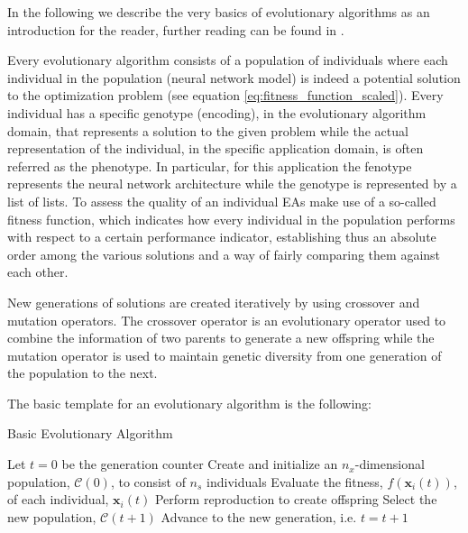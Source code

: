 \documentclass[journal]{IEEEtran}
\begin{document}
In the following we describe the very basics of evolutionary algorithms as an introduction for the reader, further reading can be found in \cite{Engelbrecht, Ebehart2007, Sumathi2010}. 

Every evolutionary algorithm consists of a population of individuals where each individual in the population (neural network model) is indeed a potential solution to the optimization problem (see equation \ref{eq:fitness_function_scaled}). Every individual has a specific genotype (encoding), in the evolutionary algorithm domain, that represents a solution to the given problem while the actual representation of the individual, in the specific application domain, is often referred as the phenotype. In particular, for this application  the fenotype represents the neural network architecture while the genotype is represented by a list of lists. To assess the quality of an individual EAs make use of a so-called fitness function, which indicates how every individual in the population performs with respect to a certain performance indicator, establishing thus an absolute order among the various solutions and a way of fairly comparing them against each other. 

New generations of solutions are created iteratively by using crossover and mutation operators. The crossover operator is an evolutionary operator used to combine the information of two parents to generate a new offspring while the mutation operator is used to maintain genetic diversity from one generation of the population to the next.

The basic template for an evolutionary algorithm is the following:

\begin{algorithm}[!htb]
\caption{Basic Evolutionary Algorithm}
\begin{algorithmic}
\State Let $t = 0$ be the generation counter
\State Create and initialize an $n_x$-dimensional population, $\mathcal{C}(0)$, to consist of $n_s$ individuals
	\State Evaluate the fitness, $f(\mathbf{x}_i(t))$, of each individual, $\mathbf{x}_i(t)$
	\State Perform reproduction to create offspring
	\State Select the new population, $\mathcal{C}(t+1)$
	\State Advance to the new generation, i.e. $t = t +1$
\EndWhile
\end{algorithmic}
\label{algorithm:generic_ea}
\end{algorithm}
\end{document}
